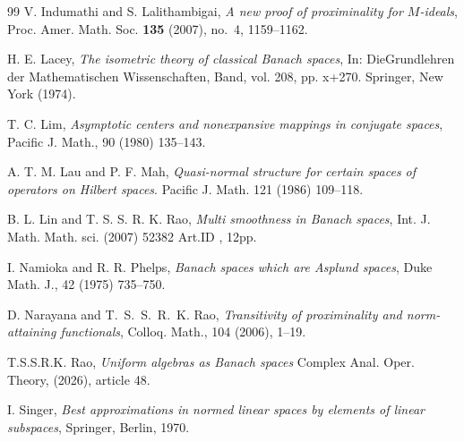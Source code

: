 \documentclass[11pt]{amsart}
\begin{document}
\begin{thebibliography}{99}
 V. Indumathi and S. Lalithambigai, \emph{A new proof of proximinality for $M$-ideals}, Proc. Amer. Math. Soc. {\bf 135} (2007), no.~4, 1159--1162.

 H. E.  Lacey, {\em  The isometric theory of classical Banach spaces}, In: DieGrundlehren der Mathematischen Wissenschaften, Band, vol. 208, pp. x+270. Springer, New York (1974).

 T. C. Lim, {\em Asymptotic centers and nonexpansive mappings in conjugate spaces}, Pacific J. Math., 90 (1980) 135--143.

 A. T. M. Lau and P. F. Mah, {\em Quasi-normal structure for certain spaces of operators on Hilbert spaces}. Pacific J. Math. 121 (1986) 109--118.

 B. L. Lin and T. S. S. R. K. Rao, {\em Multi smoothness in Banach spaces}, Int. J. Math. Math. sci. (2007) 52382  Art.ID , 12pp.

 I. Namioka and R. R. Phelps, {\em Banach spaces which are Asplund spaces}, Duke Math. J., 42 (1975) 735--750.

 D. Narayana and T.~S.~S.~R.~K. Rao, {\em Transitivity of proximinality and norm-attaining functionals}, Colloq. Math., 104 (2006),
 1--19.

 T.S.S.R.K. Rao, \emph{Uniform algebras as Banach spaces} Complex Anal. Oper. Theory, (2026), article 48. 
 
  I. Singer, {\em Best approximations in normed linear spaces by elements of linear subspaces}, Springer, Berlin, 1970.
\end{thebibliography}
\end{document}
